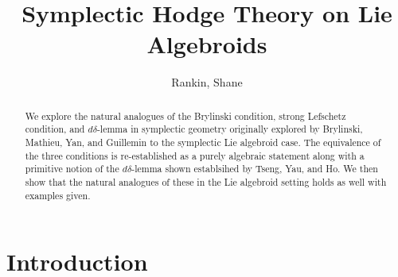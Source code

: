 \documentclass{amsart}
\title{Symplectic Hodge Theory on Lie Algebroids}
\author{Rankin, Shane}
\theoremstyle{definition}
\begin{document}
\begin{abstract}
    We explore the natural analogues of the Brylinski condition, strong Lefschetz condition, and $d\delta$-lemma in symplectic geometry originally explored by Brylinski, Mathieu, Yan, and Guillemin to the symplectic Lie algebroid case. The equivalence of the three conditions is re-established as a purely algebraic statement along with a primitive notion of the $d\delta$-lemma shown establsihed by Tseng, Yau, and Ho. We then show that the natural analogues of these in the Lie algebroid setting holds as well with examples given.
\end{abstract}
\maketitle


\tableofcontents
\section{Introduction}
\end{document}
